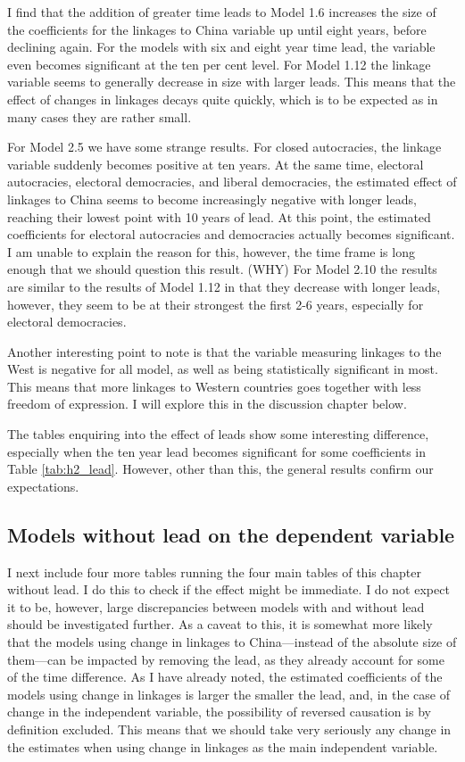 I find that the addition of greater time leads to Model 1.6 increases the size of the coefficients for the linkages to China variable up until eight years, before declining again. For the models with six and eight year time lead, the variable even becomes significant at the ten per cent level. For Model 1.12 the linkage variable seems to generally decrease in size with larger leads. This means that the effect of changes in linkages decays quite quickly, which is to be expected as in many cases they are rather small.

For Model 2.5 we have some strange results. For closed autocracies, the linkage variable suddenly becomes positive at ten years. At the same time,  electoral autocracies, electoral democracies, and liberal democracies, the estimated effect of linkages to China seems to become increasingly negative with longer leads, reaching their lowest point with 10 years of lead. At this point, the estimated coefficients for electoral autocracies and democracies actually becomes significant. I am unable to explain the reason for this, however, the time frame is long enough that we should question this result. (WHY) For Model 2.10 the results are similar to the results of Model 1.12 in that they decrease with longer leads, however, they seem to be at their strongest the first 2-6 years, especially for electoral democracies.

Another interesting point to note is that the variable measuring linkages to the West is negative for all model, as well as being statistically significant in most. This means that more linkages to Western countries goes together with less freedom of expression. I will explore this in the discussion chapter below.

The tables enquiring into the effect of leads show some interesting difference, especially when the ten year lead becomes significant for some coefficients in Table \ref{tab:h2_lead}. However, other than this, the general results confirm our expectations. 

\subsection{Models without lead on the dependent variable}
I next include four more tables running the four main tables of this chapter without lead. I do this to check if the effect might be immediate. I do not expect it to be, however, large discrepancies between models with and without lead should be investigated further. As a caveat to this, it is somewhat more likely that the models using change in linkages to China---instead of the absolute size of them---can be impacted by removing the lead, as they already account for some of the time difference. As I have already noted, the estimated coefficients of the models using change in linkages is larger the smaller the lead, and, in the case of change in the independent variable, the possibility of reversed causation is by definition excluded. This means that we should take very seriously any change in the estimates when using change in linkages as the main independent variable.

